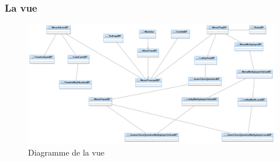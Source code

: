 \subsubsection{La vue}
\begin{figure}[h]
	\centering
	\includegraphics[width=\textwidth]{ttmc_vue.png}
	\caption{Diagramme de la vue}
	\label{fig:diag_vue}
\end{figure}

